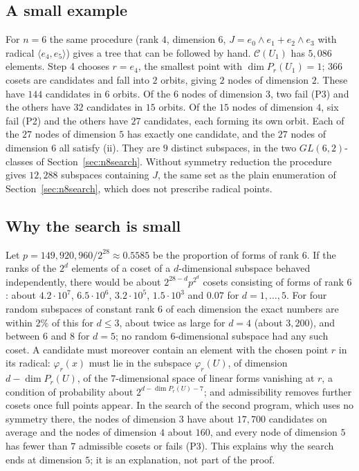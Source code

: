 \documentclass[11pt]{article}
\theoremstyle{definition}
\begin{document}
\subsection{A small example}
For $n=6$ the same procedure (rank $4$, dimension $6$, $J=e_0\wedge e_1+e_2\wedge e_3$ with
radical $\langle e_4,e_5\rangle$) gives a tree that can be followed by hand. $\mathcal C(U_1)$ has
$5{,}086$ elements. Step 4 chooses $r=e_4$, the smallest point with $\dim P_r(U_1)=1$; $366$
cosets are candidates and fall into $2$ orbits, giving $2$ nodes of dimension $2$. These have
$144$ candidates in $6$ orbits. Of the $6$ nodes of dimension $3$, two fail (P3) and the others
have $32$ candidates in $15$ orbits. Of the $15$ nodes of dimension $4$, six fail (P2) and the
others have $27$ candidates, each forming its own orbit. Each of the $27$ nodes of dimension $5$
has exactly one candidate, and the $27$ nodes of dimension $6$ all satisfy (ii). They are $9$
distinct subspaces, in the two $GL(6,2)$-classes of Section~\ref{sec:n8search}. Without symmetry
reduction the procedure gives $12{,}288$ subspaces containing $J$, the same set as the plain
enumeration of Section~\ref{sec:n8search}, which does not prescribe radical points.

\subsection{Why the search is small}\label{app:small}
Let $p=149{,}920{,}960/2^{28}\approx0.5585$ be the proportion of forms of rank $6$. If the ranks of
the $2^d$ elements of a coset of a $d$-dimensional subspace behaved independently, there would be
about $2^{28-d}p^{2^d}$ cosets consisting of forms of rank $6$: about $4.2\cdot10^7$,
$6.5\cdot10^6$, $3.2\cdot10^5$, $1.5\cdot10^3$ and $0.07$ for $d=1,\dots,5$. For four random
subspaces of constant rank $6$ of each dimension the exact numbers are within $2\%$ of this for
$d\le3$, about twice as large for $d=4$ (about $3{,}200$), and between $6$ and $8$ for $d=5$; no
random $6$-dimensional subspace had any such coset. A candidate must moreover contain an element with
the chosen point $r$ in its radical: $\varphi_r(x)$ must lie in the subspace $\varphi_r(U)$, of
dimension $d-\dim P_r(U)$, of the $7$-dimensional space of linear forms vanishing at $r$, a
condition of probability about $2^{d-\dim P_r(U)-7}$; and admissibility removes further cosets
once full points appear. In the search of the second program, which uses no symmetry there, the nodes of dimension $3$
have about $17{,}700$
candidates on average and the nodes of dimension $4$ about $160$, and every node of dimension
$5$ has fewer than $7$ admissible cosets or fails (P3). This explains why the search ends at
dimension $5$; it is an explanation, not part of the proof.
\end{document}
